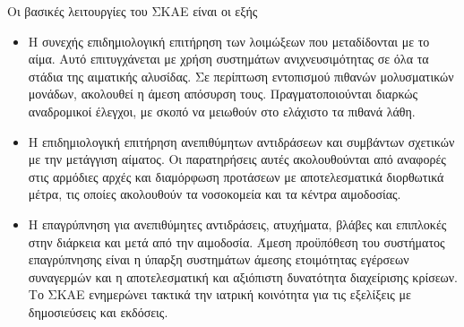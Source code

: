 Οι βασικές λειτουργίες του ΣΚΑΕ είναι οι εξής \cite{cite-revekka1}
\begin{itemize}
		\item Η συνεχής επιδημιολογική επιτήρηση των λοιμώξεων που μεταδίδονται με το αίμα. Αυτό επιτυγχάνεται με χρήση συστημάτων ανιχνευσιμότητας σε όλα τα στάδια της αιματικής αλυσίδας. Σε περίπτωση εντοπισμού πιθανών μολυσματικών μονάδων, ακολουθεί η άμεση απόσυρση τους. Πραγματοποιούνται διαρκώς αναδρομικοί έλεγχοι, με σκοπό να μειωθούν στο ελάχιστο τα πιθανά λάθη. 
		\item	Η επιδημιολογική επιτήρηση ανεπιθύμητων αντιδράσεων και συμβάντων σχετικών με την μετάγγιση αίματος. Οι παρατηρήσεις αυτές ακολουθούνται από αναφορές στις αρμόδιες αρχές και διαμόρφωση προτάσεων με αποτελεσματικά διορθωτικά μέτρα, τις οποίες ακολουθούν τα νοσοκομεία και τα κέντρα αιμοδοσίας.  
		\item Η επαγρύπνηση για ανεπιθύμητες αντιδράσεις, ατυχήματα, βλάβες και επιπλοκές στην διάρκεια και μετά από την αιμοδοσία. Άμεση προϋπόθεση του συστήματος επαγρύπνησης είναι η ύπαρξη συστημάτων άμεσης ετοιμότητας εγέρσεων συναγερμών και η αποτελεσματική και αξιόπιστη δυνατότητα διαχείρισης κρίσεων.  Το ΣΚΑΕ ενημερώνει τακτικά την ιατρική κοινότητα για τις εξελίξεις με δημοσιεύσεις και εκδόσεις. 
		\end{itemize}
		